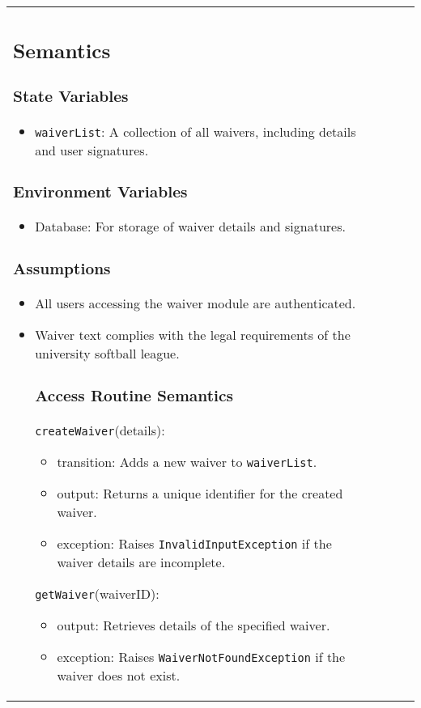 \documentclass[12pt, titlepage]{article}
\begin{document}
\begin{itemize}
\begin{center}
\begin{tabular}{|p{3cm}|p{4cm}|p{4cm}|p{4cm}|}
\subsection{Semantics}

\subsubsection{State Variables}

\begin{itemize}
    \item \texttt{waiverList}: A collection of all waivers, including details and user signatures.
\end{itemize}

\subsubsection{Environment Variables}
\begin{itemize}
    \item Database: For storage of waiver details and signatures.
\end{itemize}

\subsubsection{Assumptions}
\begin{itemize}
    \item All users accessing the waiver module are authenticated.
    \item Waiver text complies with the legal requirements of the university softball league.
    
\subsubsection{Access Routine Semantics}

\noindent \texttt{createWaiver}(details):  
\begin{itemize}
    \item transition: Adds a new waiver to \texttt{waiverList}.
    \item output: Returns a unique identifier for the created waiver.
    \item exception: Raises \texttt{InvalidInputException} if the waiver details are incomplete.
\end{itemize}

\noindent \texttt{getWaiver}(waiverID):  
\begin{itemize}
    \item output: Retrieves details of the specified waiver.
    \item exception: Raises \texttt{WaiverNotFoundException} if the waiver does not exist.
\end{itemize}


\end{itemize}
\end{tabular}
\end{center}
\end{itemize}
\end{document}
